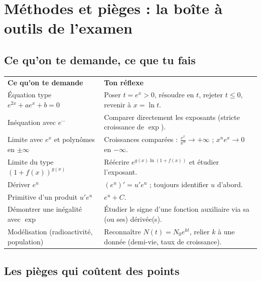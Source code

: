 \documentclass[11pt,a4paper]{article}
\begin{document}
\section{Méthodes et pièges : la boîte à outils de l'examen}

\subsection{Ce qu'on te demande, ce que tu fais}

\begin{center}
\renewcommand{\arraystretch}{1.45}
\sffamily\small
\begin{tabular}{>{\raggedright\arraybackslash}p{7.2cm} >{\raggedright\arraybackslash}p{8cm}}
\rowcolor{qtealdark} \color{white}\bfseries Ce qu'on te demande & \color{white}\bfseries Ton réflexe \\
\rowcolor{tealpale} Équation type $e^{2x}+ae^x+b=0$ & Poser $t=e^x>0$, résoudre en $t$, rejeter $t\leq0$, revenir à $x=\ln t$. \\
Inéquation avec $e^{\cdots}$ & Comparer directement les exposants (stricte croissance de $\exp$). \\
\rowcolor{tealpale} Limite avec $e^x$ et polynômes en $\pm\infty$ & Croissances comparées : $\frac{e^x}{x^n}\to+\infty$ ; $x^ne^x\to0$ en $-\infty$. \\
Limite du type $(1+f(x))^{g(x)}$ & Réécrire $e^{g(x)\ln(1+f(x))}$ et étudier l'exposant. \\
\rowcolor{tealpale} Dériver $e^u$ & $(e^u)'=u'e^u$ ; toujours identifier $u$ d'abord. \\
Primitive d'un produit $u'e^u$ & $e^u+C$. \\
\rowcolor{tealpale} Démontrer une inégalité avec $\exp$ & Étudier le signe d'une fonction auxiliaire via sa (ou ses) dérivée(s). \\
Modélisation (radioactivité, population) & Reconnaître $N(t)=N_0e^{kt}$, relier $k$ à une donnée (demi-vie, taux de croissance). \\
\end{tabular}
\end{center}

\subsection{Les pièges qui coûtent des points}
\end{document}

